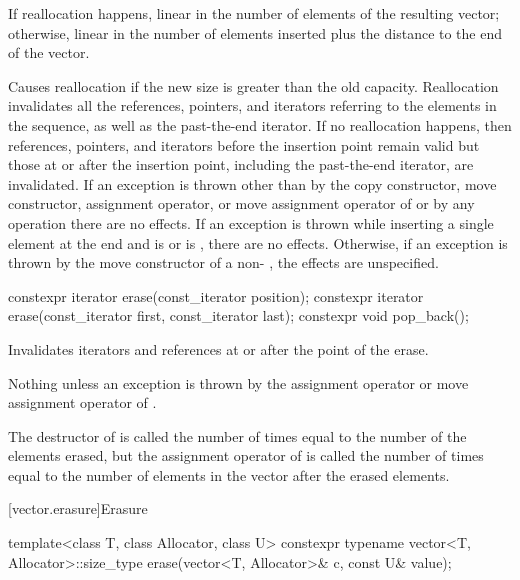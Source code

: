 \begin{itemdescr}
\pnum
\complexity
If reallocation happens,
linear in the number of elements of the resulting vector;
otherwise,
linear in the number of elements inserted plus the distance
to the end of the vector.

\pnum
\remarks
Causes reallocation if the new size is greater than the old capacity.
Reallocation invalidates all the references, pointers, and iterators
referring to the elements in the sequence, as well as the past-the-end iterator.
If no reallocation happens, then
references, pointers, and iterators
before the insertion point remain valid
but those at or after the insertion point,
including the past-the-end iterator,
are invalidated.
If an exception is thrown other than by
the copy constructor, move constructor,
assignment operator, or move assignment operator of
 or by any  operation
there are no effects.
If an exception is thrown while inserting a single element at the end and
 is  or 
is , there are no effects.
Otherwise, if an exception is thrown by the move constructor of a non-
, the effects are unspecified.
\end{itemdescr}

%
\begin{itemdecl}
constexpr iterator erase(const_iterator position);
constexpr iterator erase(const_iterator first, const_iterator last);
constexpr void pop_back();
\end{itemdecl}

\begin{itemdescr}
\pnum
\effects
Invalidates iterators and references at or after the point of the erase.

\pnum
\throws
Nothing unless an exception is thrown by the
assignment operator or move assignment operator of
.

\pnum
\complexity
The destructor of  is called the number of times equal to the
number of the elements erased, but the assignment operator
of  is called the number of times equal to the number of
elements in the vector after the erased elements.
\end{itemdescr}

[vector.erasure]{Erasure}

%
\begin{itemdecl}
template<class T, class Allocator, class U>
  constexpr typename vector<T, Allocator>::size_type
    erase(vector<T, Allocator>& c, const U& value);
\end{itemdecl}

